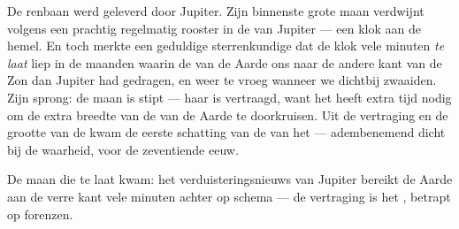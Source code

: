 \begin{example}\label{ex:g8:speed-of-light:romer}
De renbaan werd geleverd door Jupiter. Zijn binnenste grote maan
verdwijnt volgens een prachtig regelmatig rooster in de
 van Jupiter --- een klok aan de hemel. En toch merkte een
geduldige sterrenkundige dat de klok vele minuten \emph{te laat} liep
in de maanden waarin de  van de Aarde ons naar de
andere kant van de Zon dan Jupiter had gedragen, en weer te vroeg
wanneer we dichtbij zwaaiden. Zijn sprong: de maan is stipt --- haar
\emph{} is vertraagd, want het heeft extra tijd nodig om de
extra breedte van de  van de Aarde te doorkruisen.
Uit de vertraging en de grootte van de  kwam de
eerste schatting van de  van het  ---
adembenemend dicht bij de waarheid, voor de zeventiende eeuw.
\end{example}

\begin{omfigure}

{\small De maan die te laat kwam: het verduisteringsnieuws van Jupiter
bereikt de Aarde aan de verre kant vele minuten achter op schema --- de
vertraging is het , betrapt op forenzen.}
\end{omfigure}

